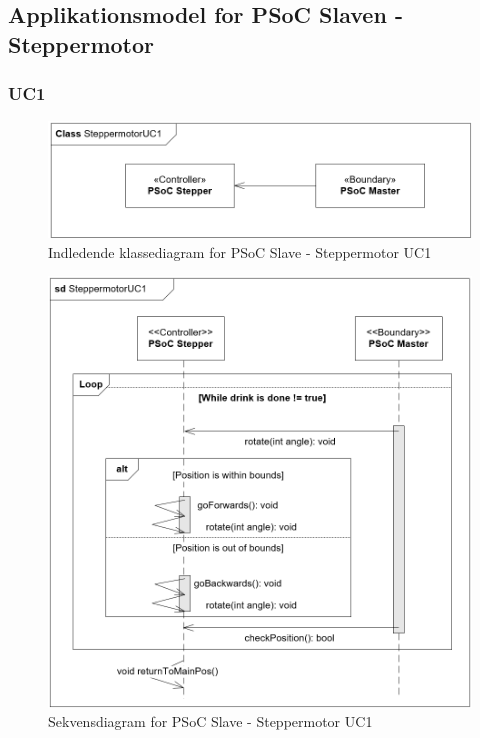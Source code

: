 \subsection{Applikationsmodel for PSoC Slaven - Steppermotor}
\subsubsection{UC1}
\begin{figure}[H]
	\centering
	\includegraphics[width=1\textwidth]{Images/Applikationsmodeller/PSoCStepper/ClassSteppermotorUC1.png}
	\caption{Indledende klassediagram for PSoC Slave - Steppermotor UC1}
	\label{fig:preClassStepperUC1}
\end{figure}

\begin{figure}[H]
	\centering
	\includegraphics[width=1\textwidth]{Images/Applikationsmodeller/PSoCStepper/sdSteppermotorUC1.png}
	\caption{Sekvensdiagram for PSoC Slave - Steppermotor UC1}
	\label{fig:sdStepperUC1}
\end{figure}

